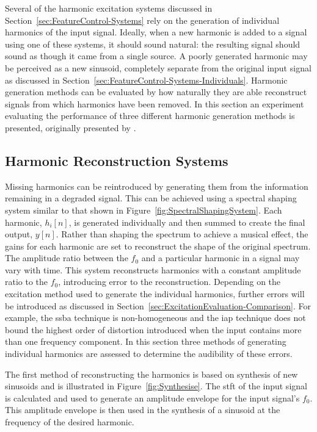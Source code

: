 	Several of the harmonic excitation systems discussed in Section~\ref{sec:FeatureControl-Systems} rely on the
	generation of individual harmonics of the input signal.  Ideally, when a new harmonic is added to a signal using
	one of these systems, it should sound natural: the resulting signal should sound as though it came from a single
	source. A poorly generated harmonic may be perceived as a new sinusoid, completely separate from the original input
	signal as discussed in Section~\ref{sec:FeatureControl-Systems-Individuals}.  Harmonic generation methods can be
	evaluated by how naturally they are able reconstruct signals from which harmonics have been removed. In this
	section an experiment evaluating the performance of three different harmonic generation methods is presented,
	originally presented by \citet{enderby2013methods}.

	\subsection{Harmonic Reconstruction Systems}
	\label{sec:PerceptualExperiments-Reconstruction-Systems}
		Missing harmonics can be reintroduced by generating them from the information remaining in a degraded
		signal. This can be achieved using a spectral shaping system similar to that shown in
		Figure~\ref{fig:SpectralShapingSystem}. Each harmonic, $h_{i}[n]$, is generated individually and then
		summed to create the final output, $y[n]$. Rather than shaping the spectrum to achieve a musical effect,
		the gains for each harmonic are set to reconstruct the shape of the original spectrum. The amplitude ratio
		between the $f_{0}$ and a particular harmonic in a signal may vary with time. This system reconstructs
		harmonics with a constant amplitude ratio to the $f_{0}$, introducing error to the reconstruction.
		Depending on the excitation method used to generate the individual harmonics, further errors will be
		introduced as discussed in Section~\ref{sec:ExcitationEvaluation-Comparison}. For example, the
		\acrshort{ssba} technique is non-homogeneous and the \acrshort{iap} technique does not bound the highest
		order of distortion introduced when the input contains more than one frequency component. In this section
		three methods of generating individual harmonics are assessed to determine the audibility of these errors.

		The first method of reconstructing the harmonics is based on synthesis of new sinusoids and is illustrated
		in Figure~\ref{fig:Synthesise}. The \acrshort{stft} of the input signal is calculated and used to generate
		an amplitude envelope for the input signal's $f_{0}$. This amplitude envelope is then used in the synthesis
		of a sinusoid at the frequency of the desired harmonic.

